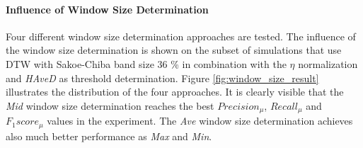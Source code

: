 \paragraph{Influence of Window Size Determination} Four different window size determination approaches are tested. The
influence of the window size determination is shown on the subset of simulations that use DTW with Sakoe-Chiba band size
36 \% in combination with the $\eta$ normalization and \textit{HAveD} as threshold determination. Figure
\ref{fig:window_size_result} illustrates the distribution of the four approaches. It is clearly visible that the
\textit{Mid} window size determination reaches the best $Precision_{\mu}$, $Recall_{\mu}$ and $F_{1}score_{\mu}$
values in the experiment. The \textit{Ave} window size determination achieves also much better performance as
\textit{Max} and \textit{Min}.

